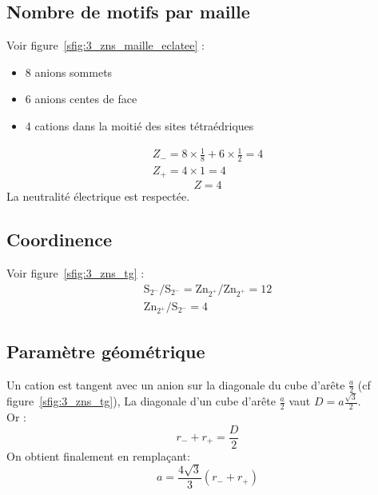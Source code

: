 \subsection{Nombre de motifs par maille}
Voir figure~\ref{sfig:3_zns_maille_eclatee} :
\begin{itemize}
    \item 8 anions sommets
    \item 6 anions centes de face
    \item 4 cations dans la moitié des sites tétraédriques
\end{itemize}
\begin{gather*}
    Z_- = 8 \times \frac{1}{8} + 6 \times \frac{1}{2} = 4\\
    Z_+ = 4 \times 1 = 4
\end{gather*}
\begin{equation}
    Z = 4
\end{equation}
La neutralité électrique est respectée.

\subsection{Coordinence}
Voir figure~\ref{sfig:3_zns_tg} :\\
\begin{gather}
    \text{S}_{2^-}/\text{S}_{2^-} = \text{Zn}_{2^+}/\text{Zn}_{2^+} = 12\\
    \text{Zn}_{2^+}/\text{S}_{2^-} = 4
\end{gather}


\subsection{Paramètre géométrique}
Un cation est tangent avec un anion sur la diagonale du cube d'arête $\frac{a}{2}$
(cf figure~\ref{sfig:3_zns_tg}),
La diagonale d'un cube d'arête $\frac{a}{2}$ vaut $D = a\frac{\sqrt{3}}{2}$.\\
Or :
\begin{equation}
    r_- + r_+ = \frac{D}{2}
\end{equation}
On obtient finalement en remplaçant:
\begin{equation}
    \boxed{a = \frac{4\sqrt{3}}{3}(r_- + r_+)}
    \label{eq:3_zns_ar+r-}
\end{equation}


